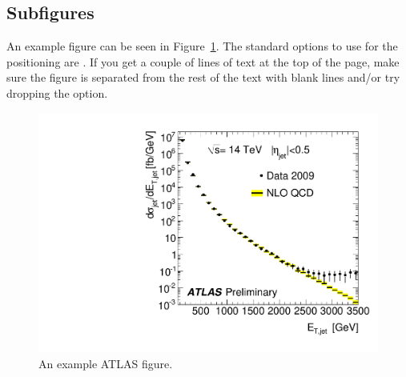 \subsection{Subfigures}

An example figure can be seen in Figure~\ref{fig:example}.
The standard options to use for the positioning are .
If you get a couple of lines of text at the top of the page,
make sure the figure is separated from the rest of the text with blank lines and/or try dropping the  option.

\begin{figure}[htbp]
  \centering
  \includegraphics[width=0.5\columnwidth]{AtlasExample}
  \caption{An example ATLAS figure.}
  \label{fig:example}
\end{figure}

